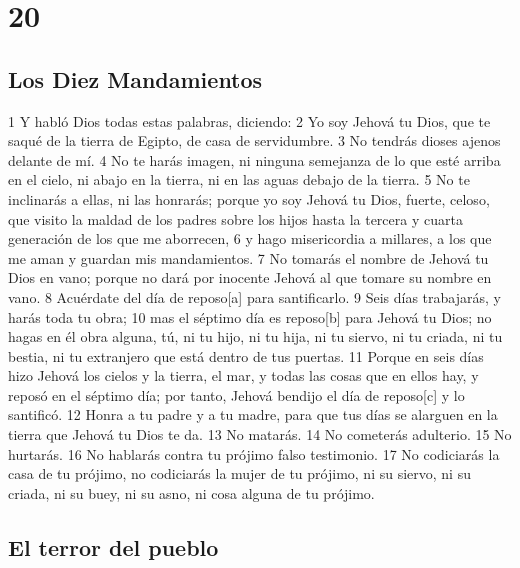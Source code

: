 \chapter{20}

\section{Los Diez Mandamientos}

1 Y habló Dios todas estas palabras, diciendo:
2 Yo soy Jehová tu Dios, que te saqué de la tierra de Egipto, de casa de servidumbre.
3 No tendrás dioses ajenos delante de mí.
4 No te harás imagen, ni ninguna semejanza de lo que esté arriba en el cielo, ni abajo en la tierra, ni en las aguas debajo de la tierra.
5 No te inclinarás a ellas, ni las honrarás; porque yo soy Jehová tu Dios, fuerte, celoso, que visito la maldad de los padres sobre los hijos hasta la tercera y cuarta generación de los que me aborrecen,
6 y hago misericordia a millares, a los que me aman y guardan mis mandamientos.
7 No tomarás el nombre de Jehová tu Dios en vano; porque no dará por inocente Jehová al que tomare su nombre en vano.
8 Acuérdate del día de reposo[a] para santificarlo.
9 Seis días trabajarás, y harás toda tu obra;
10 mas el séptimo día es reposo[b] para Jehová tu Dios; no hagas en él obra alguna, tú, ni tu hijo, ni tu hija, ni tu siervo, ni tu criada, ni tu bestia, ni tu extranjero que está dentro de tus puertas.
11 Porque en seis días hizo Jehová los cielos y la tierra, el mar, y todas las cosas que en ellos hay, y reposó en el séptimo día; por tanto, Jehová bendijo el día de reposo[c] y lo santificó.
12 Honra a tu padre y a tu madre, para que tus días se alarguen en la tierra que Jehová tu Dios te da.
13 No matarás.
14 No cometerás adulterio.
15 No hurtarás.
16 No hablarás contra tu prójimo falso testimonio.
17 No codiciarás la casa de tu prójimo, no codiciarás la mujer de tu prójimo, ni su siervo, ni su criada, ni su buey, ni su asno, ni cosa alguna de tu prójimo.

\section{El terror del pueblo}

